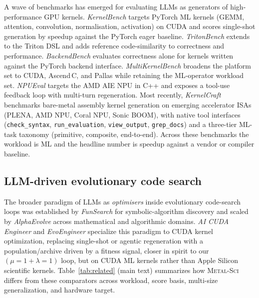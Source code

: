 \documentclass{article}
\theoremstyle{plain}
\theoremstyle{definition}
\theoremstyle{remark}
\begin{document}
A wave of benchmarks has emerged for evaluating LLMs as generators of
high-performance GPU kernels. \emph{KernelBench} \cite{ouyang2025kernelbench} targets PyTorch ML
kernels (GEMM, attention, convolution, normalisation, activation) on
CUDA and scores single-shot generation by speedup against the PyTorch
eager baseline. \emph{TritonBench} \cite{li2025tritonbench} extends to the Triton DSL and
adds reference code-similarity to correctness and performance.
\emph{BackendBench} \cite{saroufim2025backendbench} evaluates correctness alone for kernels written
against the PyTorch backend interface. \emph{MultiKernelBench} \cite{wen2025multikernelbench}
broadens the platform set to CUDA, Ascend\,C, and Pallas while retaining
the ML-operator workload set. \emph{NPUEval} \cite{kalade2025npueval} targets the AMD AIE
NPU in C++ and exposes a tool-use feedback loop with multi-turn
regeneration. Most recently, \emph{KernelCraft} \cite{nie2026kernelcraft} benchmarks
bare-metal assembly kernel generation on emerging accelerator ISAs
(PLENA, AMD NPU, Coral NPU, Sonic BOOM), with native tool interfaces
(\texttt{check\_syntax}, \texttt{run\_evaluation}, \texttt{view\_output},
\texttt{grep\_docs}) and a three-tier ML-task taxonomy (primitive,
composite, end-to-end). Across these benchmarks the workload is ML and
the headline number is speedup against a vendor or compiler baseline.

\subsection{LLM-driven evolutionary code search}

The broader paradigm of LLMs as \emph{optimisers} inside evolutionary
code-search loops was established by \emph{FunSearch} \cite{funsearch} for
symbolic-algorithm discovery and scaled by \emph{AlphaEvolve} \cite{novikov2025alphaevolve} across
mathematical and algorithmic domains. \emph{AI CUDA Engineer} \cite{lange2025towards} and
\emph{EvoEngineer} \cite{guo2025evoengineer} specialize this paradigm to CUDA kernel
optimization, replacing single-shot or agentic regeneration with a
population/archive driven by a fitness signal, closer in spirit to
our $(\mu{=}1{+}\lambda{=}1)$ loop, but on CUDA ML kernels rather than
Apple Silicon scientific kernels. Table~\ref{tab:related} (main text)
summarizes how \textsc{Metal-Sci} differs from these comparators
across workload, score basis, multi-size generalization, and
hardware target.
\end{document}
